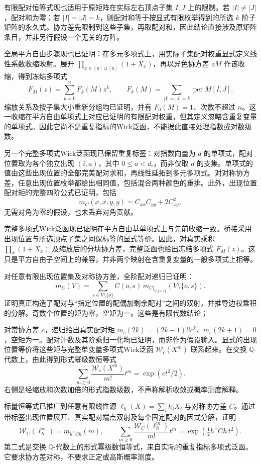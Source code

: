 \documentclass[UTF8,11pt,fontset=fandol]{ctexart}
\begin{document}
有限配对恒等式现也适用于原矩阵在实际左右顶点子集 $I,J$ 上的限制。若 $|I|\ne|J|$，配对和为零；若 $|I|=|J|=k$，则配对和等于按显式有限枚举得到的所选 $k$ 阶子矩阵的永久式。协方差先限制到这些子集，再取配对和，因此结论直接涉及原矩阵条目，并非另行假设一个无关的方阵。

全局平方自由步骤现也已证明：在多元多项式上，用实际子集配对权重显式定义线性系数收缩映射。展开 $\prod_{x\in[n]\sqcup[n]}(1+X_x)$，再以异色协方差 $zM$ 作该收缩，得到冻结多项式
\[
 F_M(z)=\sum_{k=0}^{n}F_k(M)z^k,\qquad
 F_k(M)=\sum_{|I|=|J|=k}\operatorname{per}M[I,J].
\]
缩放关系及按子集大小重新分组均已证明，并有 $F_0(M)=1$、次数不超过 $n$。这一收缩在平方自由单项式上对应已证明的有限配对权重，但其定义忽略含重复变量的单项式。因此它尚不是重复指标的Wick泛函，不能据此直接处理指数或对数级数。

另一个完整多项式Wick泛函现已保留重复标签：对指数向量为 $d$ 的单项式，配对位置取为各个独立出现 $(i,a)$，其中 $0\le a<d_i$，而非仅取 $d$ 的支集。单项式的值由这些出现位置的全部完美配对求和，再线性延拓到多元多项式。对对称协方差，任意出现位置枚举都给出相同值，包括混合两种颜色的重排。此外，出现位置配对矩的完整四阶公式已证明，包括
\[
 m_C(x,x,y,y)=C_{xx}C_{yy}+2C_{xy}^2,
\]
无需对角为零的假设，也未丢弃对角贡献。

完整多项式Wick泛函现已证明在平方自由基单项式上与先前收缩一致。桥接采用出现位置与所选顶点子集之间保标签的显式等价。因此，对真实乘积 $\prod_x(1+X_x)$ 及缩放后的分块协方差，完整泛函也给出冻结多项式 $F_M(z)$。这只是平方自由子空间上的兼容，并非两个映射在含重复变量的一般多项式上相等。

对任意有限出现位置集及对称协方差，全阶配对递归已证明：
\[
 m_C(V)=\sum_{s\in V\setminus\{o\}} C(o,s)\,
 m_{C|_{V\setminus\{o,s\}}}(V\setminus\{o,s\}).
\]
证明真正构造了配对与“指定位置的配偶加剩余配对”之间的双射，并推导边权乘积的分解。奇数个位置的矩为零，空矩为一。这些是有限代数结论；

对常协方差 $c$，递归给出真实配对矩 $m_c(2k)=(2k-1)!!c^k$、$m_c(2k+1)=0$，空矩为一。配对计数及其阶乘归一化均已证明，而非作为假设输入。显式的出现位置等价将这些矩与完整单变量多项式Wick泛函 $\mathcal W_c(X^m)$ 联系起来。在交换 $\mathbb Q$-代数上，由此得到形式幂级数恒等式
\[
 \sum_{m\ge0}\frac{\mathcal W_c(X^m)}{m!}t^m
 =\exp(ct^2/2).
\]
右侧是经缩放和次数加倍的形式指数级数，不声称解析收敛或概率测度解释。

标量恒等式已推广到任意有限线性源 $\ell_h(X)=\sum_i h_iX_i$ 与对称协方差 $C$。通过带标签出现位置展开、真实配对端点双射及每个固定配对的因式分解，证明
\[
 \mathcal W_C(\ell_h^m)=m_{h^{\mathsf T}Ch}(m),\qquad
 \sum_{m\ge0}\frac{\mathcal W_C(\ell_h^m)}{m!}t^m
 =\exp\!\left(\tfrac12 h^{\mathsf T}Ch\,t^2\right).
\]
第二式是交换 $\mathbb Q$-代数上的形式幂级数恒等式，来自实际的重复指标多项式泛函。它要求协方差对称，不要求正定或高斯概率测度。
\end{document}
